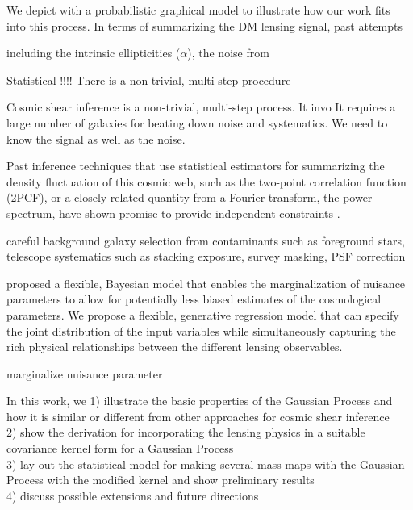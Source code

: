 

We depict with a probabilistic graphical model to illustrate how our work
fits into this process.
In terms of summarizing the DM lensing signal, past attempts   

 
including the intrinsic ellipticities ($\alpha$),
the noise from 

Statistical !!!!
There is a non-trivial, multi-step procedure 

Cosmic shear inference is a non-trivial, multi-step process. It invo 
It requires a large number of galaxies for beating down noise and systematics. 
We need to know the signal as well as the noise. 



Past inference techniques that use statistical estimators for summarizing the 
density fluctuation of this cosmic web, such as  
the two-point correlation function (2PCF), or a closely related quantity from a
Fourier transform, the power spectrum, have shown promise to provide 
independent constraints \citep{Jee2013a}.  

careful background galaxy selection from contaminants
such as foreground stars, telescope systematics such as stacking exposure, 
survey masking, PSF correction 


\cite{Schneider2014} proposed a flexible, Bayesian model that enables the
marginalization of nuisance parameters to allow for potentially less biased 
estimates of the cosmological parameters. 
We propose a flexible, generative regression model    
that can specify the joint distribution of the input variables while 
simultaneously capturing the rich physical relationships between the different
lensing observables.  



marginalize nuisance parameter 


In this work, we 
1) illustrate the basic properties of the Gaussian Process and how it is
similar or different from other approaches for cosmic shear inference  \\ 
2) show the derivation for incorporating the lensing physics in 
a suitable covariance kernel form for a Gaussian Process  \\
3) lay out the statistical model for making several mass maps 
with the Gaussian Process with the modified kernel and show preliminary results \\ 
4) discuss possible extensions and future directions 
 
